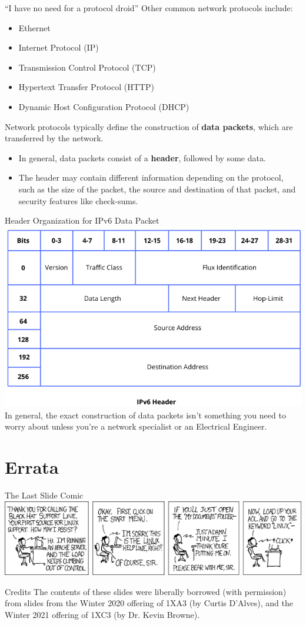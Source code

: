 \documentclass[11pt]{beamer}
\begin{document}
\begin{frame}{``I have no need for a protocol droid''}
Other common network protocols include:
\begin{itemize}
\item Ethernet
\item Internet Protocol (IP)
\item Transmission Control Protocol (TCP)
\item Hypertext Transfer Protocol (HTTP)
\item Dynamic Host Configuration Protocol (DHCP)
\end{itemize}
Network protocols typically define the construction of  \textbf{data packets}, which are transferred by the network.
\begin{itemize}
\item In general, data packets consist of a \textbf{header}, followed by some data.  
\item The header may contain different information depending on the protocol, such as the size of the packet, the source and destination of that packet, and security features like check-sums.  
\end{itemize}
\end{frame}

\begin{frame}{Header Organization for IPv6 Data Packet}
\center
\includegraphics[scale=0.32]{IPV6-header.png} \\
In general, the exact construction of data packets isn't something you need to worry about unless you're a network specialist or an Electrical Engineer.  
\end{frame}

\section[Errata]{Errata}
\begin{frame}{The Last Slide Comic}
\includegraphics[scale=0.5]{black_hat_support.png}
\end{frame}

\begin{frame}{Credits}
\center
\vspace{8em}
The contents of these slides were liberally borrowed (with permission) from slides from the Winter 2020 offering of 1XA3 (by Curtis D'Alves), and the Winter 2021 offering of 1XC3 (by Dr. Kevin Browne).  
\end{frame}
\end{document}
